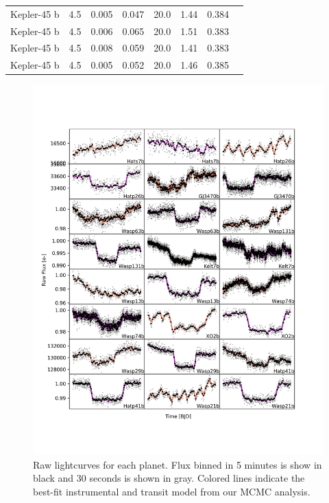 \begin{subappendices}
{\begin{landscape}
\begin{longtable}[h]{llrrrrrr}
  Kepler-45 b &               4.5 &           0.005 &      0.047 &     20.0 &          1.44 &                0.384 \\
  Kepler-45 b &               4.5 &           0.006 &      0.065 &     20.0 &          1.51 &                0.383 \\
  Kepler-45 b &               4.5 &           0.008 &      0.059 &     20.0 &          1.41 &                0.383 \\
  Kepler-45 b &               4.5 &           0.005 &      0.052 &     20.0 &          1.46 &                0.385 \\
  \hline
  \end{longtable}
  \end{landscape}
  }


  \begin{figure}
    \label{P1:fig:rawlc}
    \includegraphics[width=\textwidth]{RawLighctuves0.pdf}
    \caption{Raw lightcurves for each planet. Flux binned in 5 minutes is show in black and 30 seconds is shown in gray. Colored lines indicate the best-fit instrumental and transit model from our MCMC analysis.}
  \end{figure}


\end{subappendices}
